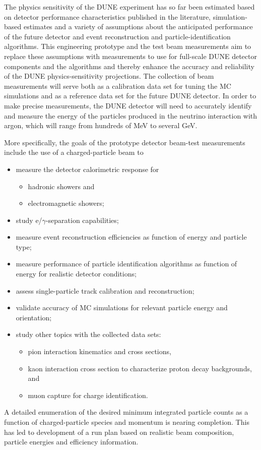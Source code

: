 The physics sensitivity of the DUNE experiment has so far been
estimated based on detector performance characteristics published in
the literature, simulation-based estimates and a variety of
assumptions about the anticipated performance of the future detector
and event reconstruction and particle-identification algorithms.  This
engineering prototype and the test beam measurements aim to replace
these assumptions with measurements to use for full-scale DUNE
detector components and the algorithms and thereby enhance the
accuracy and reliability of the DUNE physics-sensitivity projections.
The collection of beam measurements will serve both as a calibration
data set for tuning the MC simulations and as a reference data set for
the future DUNE detector.
In order to make precise measurements, the DUNE 
detector will
need to accurately identify and measure the energy of the particles
produced in the neutrino interaction with argon, which will range from
hundreds of MeV to several GeV.

More specifically, the goals of the prototype detector beam-test measurements include
the use of a charged-particle beam to
\begin{itemize}
\item measure the detector calorimetric response for
\begin{itemize}
	\item hadronic showers and
	\item electromagnetic showers;
\end{itemize}
\item study e/$\gamma$-separation capabilities;
\item measure event reconstruction efficiencies as function of energy
  and particle type;
\item measure performance of particle identification algorithms as
  function of energy for realistic detector conditions;
\item assess single-particle track calibration and reconstruction;
\item validate accuracy of MC simulations for relevant particle energy and orientation; 
\item study other topics with the collected data sets:
 \begin{itemize}
    \item pion interaction kinematics and cross sections, 
    \item kaon interaction cross section to characterize proton decay backgrounds, and
    \item muon capture for charge identification.
 \end{itemize}
\end{itemize}
A detailed enumeration of the desired minimum integrated particle
counts as a function of charged-particle species and momentum is
nearing completion. This has led to development of a run plan based on
realistic beam composition, particle energies and efficiency
information.


